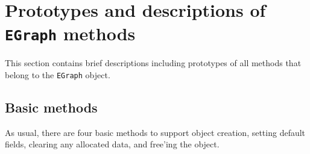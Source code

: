 \par
\section{Prototypes and descriptions of {\tt EGraph} methods}
\label{section:EGraph:proto}
\par
This section contains brief descriptions including prototypes
of all methods that belong to the {\tt EGraph} object.
\par
\subsection{Basic methods}
\label{subsection:EGraph:proto:basics}
\par
As usual, there are four basic methods to support object creation,
setting default fields, clearing any allocated data, and free'ing
the object.
\par
